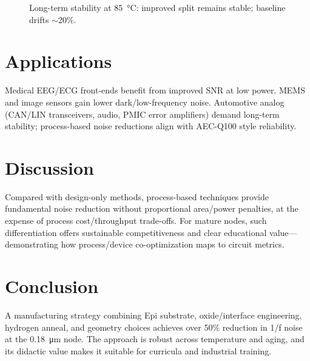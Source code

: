 \documentclass[conference]{IEEEtran}
\begin{document}
\begin{figure}[t]
\centering
{}
\caption{Long-term stability at \SI{85}{\celsius}: improved split remains stable; baseline drifts $\sim$20\%.}
\label{fig:aging}
\end{figure}

\section{Applications}
Medical EEG/ECG front-ends benefit from improved SNR at low power. MEMS and image sensors gain lower dark/low-frequency noise. Automotive analog (CAN/LIN transceivers, audio, PMIC error amplifiers) demand long-term stability; process-based noise reductions align with AEC-Q100 style reliability.

\section{Discussion}
Compared with design-only methods, process-based techniques provide fundamental noise reduction without proportional area/power penalties, at the expense of process cost/throughput trade-offs. For mature nodes, such differentiation offers sustainable competitiveness and clear educational value---demonstrating how process/device co-optimization maps to circuit metrics.

\section{Conclusion}
A manufacturing strategy combining Epi substrate, oxide/interface engineering, hydrogen anneal, and geometry choices achieves over 50\% reduction in 1/f noise at the \SI{0.18}{\micro\meter} node. The approach is robust across temperature and aging, and its didactic value makes it suitable for curricula and industrial training.
\end{document}
